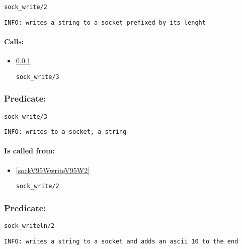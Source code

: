 \begin{verbatim}
sock_write/2
\end{verbatim}

{\small \begin{verbatim}
INFO: writes a string to a socket prefixed by its lenght

\end{verbatim}}
\paragraph{Calls:} 
\begin{itemize}
\item \ref{sockV95WwriteV95W3} 
\begin{verbatim}
sock_write/3
\end{verbatim}

\end{itemize}

\subsubsection{Predicate:} \label{sockV95WwriteV95W3}

\begin{verbatim}
sock_write/3
\end{verbatim}

{\small \begin{verbatim}
INFO: writes to a socket, a string

\end{verbatim}}
\paragraph{Is called from:} 
\begin{itemize}
\item \ref{sockV95WwriteV95W2} 
\begin{verbatim}
sock_write/2
\end{verbatim}

\end{itemize}

\subsubsection{Predicate:} \label{sockV95WwritelnV95W2}

\begin{verbatim}
sock_writeln/2
\end{verbatim}

{\small \begin{verbatim}
INFO: writes a string to a socket and adds an ascii 10 to the end

\end{verbatim}}

